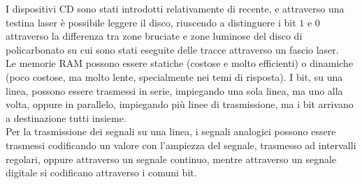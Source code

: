 \documentclass[a4paper]{extarticle}
\begin{document}
I dispositivi CD sono stati introdotti relativamente di recente, e attraverso una testina laser è possibile leggere il disco, riuscendo a distinguere i bit \(1\) e \(0\) attraverso la differenza tra zone bruciate e zone luminose del disco di policarbonato su cui sono stati eseguite delle tracce attraverso un fascio laser.\\
Le memorie RAM possono essere statiche (costose e molto efficienti) o dinamiche (poco costose, ma molto lente, specialmente nei temi di risposta). I bit, su una linea, possono essere trasmessi in serie, impiegando una sola linea, ma uno alla volta, oppure in parallelo, impiegando più linee di trasmissione, ma i bit arrivano a destinazione tutti insieme.\\
Per la trasmissione dei segnali su una linea, i segnali analogici possono essere trasmessi codificando un valore con l'ampiezza del segnale, trasmesso ad intervalli regolari, oppure attraverso un segnale continuo, mentre attraverso un segnale digitale si codificano attraverso i comuni bit.

\newpage
\end{document}
